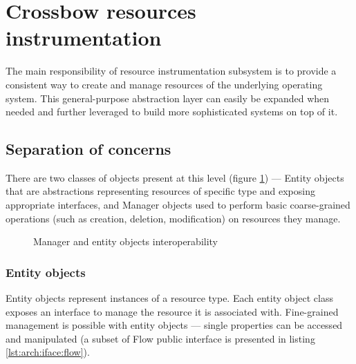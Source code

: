 \documentclass[11pt]{book}
\begin{document}
    \section{Crossbow resources instrumentation}
    \label{sec:arch:inst}

      The main responsibility of resource instrumentation subsystem is to provide a consistent way to create and manage
      resources of the underlying operating system. This general-purpose abstraction layer can easily be expanded when
      needed and further leveraged to build more sophisticated systems on top of it.


      \subsection{Separation of concerns}

        There are two classes of objects present at this level (figure \ref{fig:arch:manent}) --- Entity objects that
        are abstractions representing resources of specific type and exposing appropriate interfaces, and Manager
        objects used to perform basic coarse-grained operations (such as creation, deletion, modification) on resources
        they manage.

        \begin{figure}[H]
          \begin{center}
          \end{center}

          \caption{Manager and entity objects interoperability}
          \label{fig:arch:manent}
        \end{figure}


        \subsubsection{Entity objects}

          Entity objects represent instances of a resource type. Each entity object class exposes an interface to manage
          the resource it is associated with. Fine-grained management is possible with entity objects --- single
          properties can be accessed and manipulated (a subset of Flow public interface is presented in listing
          \ref{lst:arch:iface:flow}). \\
\end{document}
